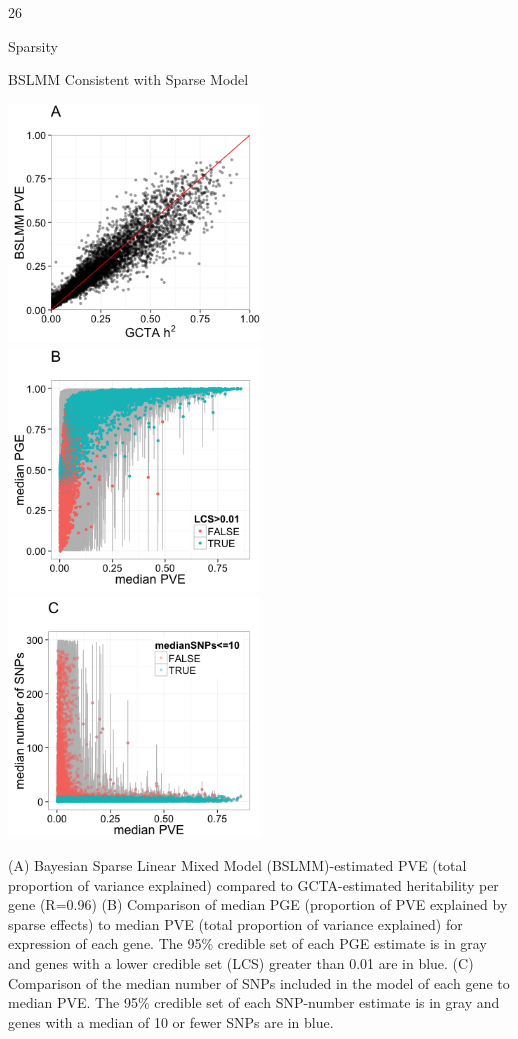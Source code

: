 \documentclass[final]{beamer}
\newcommand{\ColWidth}{26}
\begin{document}
\begin{frame}{}
\begin{textblock}{\ColWidth}
\begin{block}{Sparsity}
\end{block}
\begin{block}{BSLMM Consistent with Sparse Model}
	\begin{center}
		\includegraphics[width=0.5\textwidth]{plots/Fig-DGN-BSLMM-A.png}
		\includegraphics[width=0.5\textwidth]{plots/Fig-DGN-BSLMM-B.png}\\
		\includegraphics[width=0.5\textwidth]{plots/Fig-DGN-BSLMM-C.png}\\
	 \end{center}
	{\tiny (A) Bayesian Sparse Linear Mixed Model (BSLMM)-estimated PVE (total proportion of variance explained) compared to GCTA-estimated heritability per gene (R=0.96) (B) Comparison of median PGE (proportion of PVE explained by sparse effects) to median PVE (total proportion of variance explained) for expression of each gene. The 95\% credible set of each PGE estimate is in gray and genes with a lower credible set (LCS) greater than 0.01 are in blue. (C) Comparison of the median number of SNPs included in the model of each gene to median PVE. The 95\% credible set of each SNP-number estimate is in gray and genes with a median of 10 or fewer SNPs are in blue.\\}
\end{block}



\end{textblock}
\end{frame}
\end{document}
